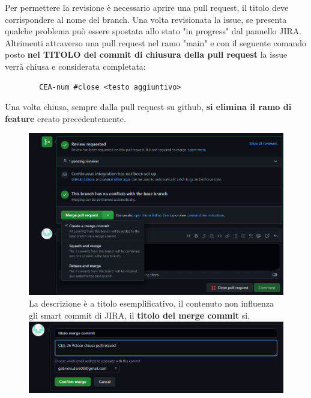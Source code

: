 	Per permettere la revisione è necessario aprire una pull request, il titolo deve corrispondere al nome del branch.
	Una volta revisionata la issue, se presenta qualche problema può essere spostata allo stato "in progress" dal pannello JIRA. Altrimenti attraverso una pull request nel ramo "main" e con il seguente comando posto \textbf{nel TITOLO del commit di chiusura della pull request} la issue verrà chiusa e considerata completata:
	\begin{lstlisting}
		CEA-num #close <testo aggiuntivo>
	\end{lstlisting}
	Una volta chiusa, sempre dalla pull request su github, \textbf{si elimina il ramo di feature} creato precedentemente.
	\begin{figure}[h!]
		\includegraphics[width=15cm]{img/git_pull_request.png}
		La descrizione è a titolo esemplificativo, il contenuto non influenza gli smart commit di JIRA, il \textbf{titolo del merge commit} si.
		\newline \includegraphics[width=15cm]{img/git_pull_request_commit.png}
	\end{figure}
	\clearpage


